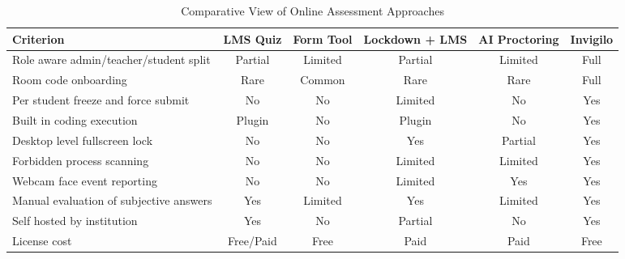 \documentclass[12pt, a4paper]{report}
\begin{document}
\begin{table}[H]
  \caption{Comparative View of Online Assessment Approaches}
  \label{tab:2.1}
  \centering
  {\fontsize{10}{13}\selectfont
    \begin{tabular}{|p{1.6in}|c|c|c|c|c|}
      \hline
      \textbf{Criterion} & \textbf{LMS Quiz} & \textbf{Form Tool} & \textbf{Lockdown + LMS} & \textbf{AI Proctoring} & \textbf{Invigilo} \\
      \hline
      Role aware admin/teacher/student split & Partial & Limited & Partial & Limited & Full \\
      \hline
      Room code onboarding & Rare & Common & Rare & Rare & Full \\
      \hline
      Per student freeze and force submit & No & No & Limited & No & Yes \\
      \hline
      Built in coding execution & Plugin & No & Plugin & No & Yes \\
      \hline
      Desktop level fullscreen lock & No & No & Yes & Partial & Yes \\
      \hline
      Forbidden process scanning & No & No & Limited & Limited & Yes \\
      \hline
      Webcam face event reporting & No & No & Limited & Yes & Yes \\
      \hline
      Manual evaluation of subjective answers & Yes & Limited & Yes & Limited & Yes \\
      \hline
      Self hosted by institution & Yes & No & Partial & No & Yes \\
      \hline
      License cost & Free/Paid & Free & Paid & Paid & Free \\
      \hline
    \end{tabular}
  }
\end{table}
\end{document}
